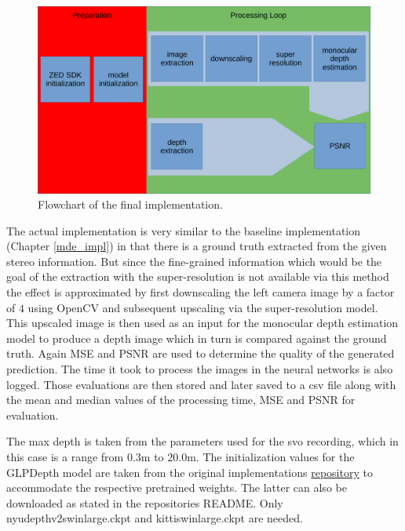\begin{figure}[ht!]
    \begin{center}
        \includegraphics[scale=.5]{resources/general_plan.pdf}
        \caption{Flowchart of the final implementation.} \label{flowchart_general}
    \end{center}
\end{figure}

The actual implementation is very similar to the baseline implementation (Chapter \ref*{mde_impl}) in that there is a ground truth extracted from the given stereo information. But since the fine-grained information which would be the goal of the extraction with the super-resolution is not available via this method the effect is approximated by first downscaling the left camera image by a factor of $4$ using OpenCV and subsequent upscaling via the super-resolution model. This upscaled image is then used as an input for the monocular depth estimation model to produce a depth image which in turn is compared against the ground truth. Again MSE and PSNR are used to determine the quality of the generated prediction. The time it took to process the images in the neural networks is also logged. Those evaluations are then stored and later saved to a csv file along with the mean and median values of the processing time, MSE and PSNR for evaluation.

The max depth is taken from the parameters used for the svo recording, which in this case is a range from $0.3\mathrm{m}$ to $20.0\mathrm{m}$. The initialization values for the GLPDepth model are taken from the original implementations  \href{https://github.com/vinvino02/GLPDepth}{repository} to accommodate the respective pretrained weights. The latter can also be downloaded as stated in the repositories README. Only nyudepthv2\textunderscore swin\textunderscore large.ckpt and kitti\textunderscore swin\textunderscore large.ckpt are needed.

